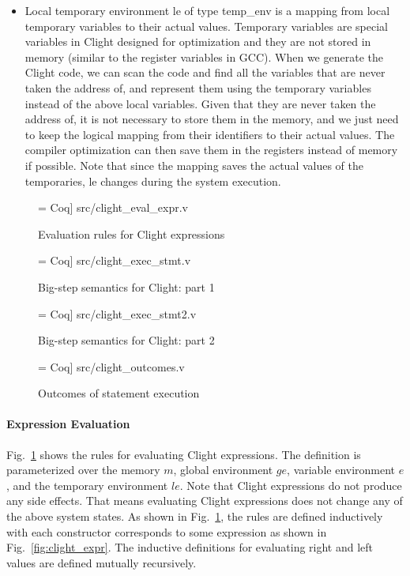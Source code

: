 \begin{itemize}[leftmargin=*]
\item Local temporary environment \textsf{le} of type \textsf{temp\_env} is
a mapping from local temporary variables to their actual values. Temporary
variables are special variables in Clight designed for optimization and
they are not stored in memory (similar to the register variables in GCC).
When we generate the Clight code, we can scan the code and find
all the variables that are never taken the address of, and represent
them using the temporary variables
instead of the above local variables. Given that they are never taken the
address of, it is not necessary to store them in the memory, and we just need
to keep the logical mapping from their identifiers to their actual values.
The compiler optimization can then save them in the registers instead of memory
if possible. Note that since the mapping saves the actual values of the temporaries,
\textsf{le} changes during the system execution.


\end{itemize}


\begin{figure}
 = Coq] {src/clight_eval_expr.v}
\caption{Evaluation rules for Clight expressions}
\label{fig:clight_eval_expr}
\end{figure}

\begin{figure}
 = Coq] {src/clight_exec_stmt.v}
\caption{Big-step semantics for Clight: part 1}
\label{fig:clight_exec_stmt}
\end{figure}

\begin{figure}
 = Coq] {src/clight_exec_stmt2.v}
\caption{Big-step semantics for Clight: part 2}
\label{fig:clight_exec_stmt2}
\end{figure}

\begin{figure}
 = Coq] {src/clight_outcomes.v}
\caption{Outcomes of statement execution}
\label{fig:clight_outcomes}
\end{figure}

\paragraph{Expression Evaluation}
Fig.~\ref{fig:clight_eval_expr} shows the rules for evaluating Clight
expressions. The definition is parameterized over the memory $m$,
global environment $ge$, variable environment $e$, and the temporary
environment $le$. Note that Clight expressions do not produce any
side effects. That means evaluating Clight expressions does not
change any of the above system states.
As shown in Fig.~\ref{fig:clight_eval_expr}, the rules are defined inductively
with each constructor corresponds to some expression as shown in Fig.~\ref{fig:clight_expr}.
The inductive definitions for evaluating right and left values are defined
mutually recursively.

